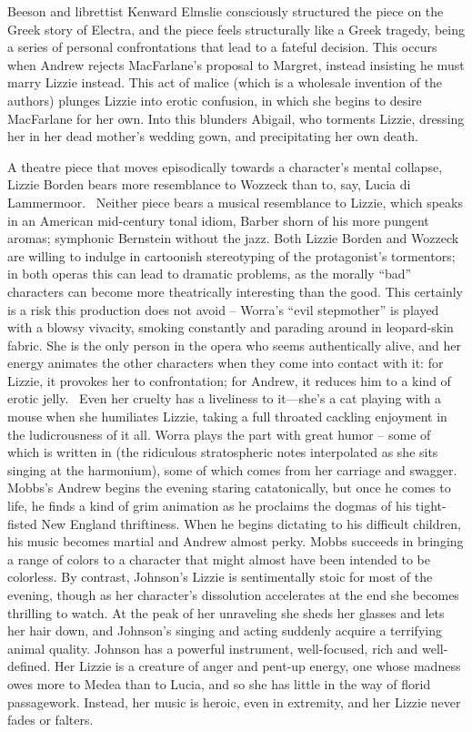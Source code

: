 Beeson and librettist Kenward Elmslie consciously structured the piece on the Greek story of Electra, and the piece feels structurally like a Greek tragedy, being a series of personal confrontations that lead to a fateful decision. This occurs when Andrew rejects MacFarlane’s proposal to Margret, instead insisting he must marry Lizzie instead. This act of malice (which is a wholesale invention of the authors) plunges Lizzie into erotic confusion, in which she begins to desire MacFarlane for her own. Into this blunders Abigail, who torments Lizzie, dressing her in her dead mother’s wedding gown, and precipitating her own death.

A theatre piece that moves episodically towards a character’s mental collapse, Lizzie Borden bears more resemblance to Wozzeck than to, say, Lucia di Lammermoor.  Neither piece bears a musical resemblance to Lizzie, which speaks in an American mid-century tonal idiom, Barber shorn of his more pungent aromas; symphonic Bernstein without the jazz. Both Lizzie Borden and Wozzeck are willing to indulge in cartoonish stereotyping of the protagonist’s tormentors; in both operas this can lead to dramatic problems, as the morally “bad” characters can become more theatrically interesting than the good. This certainly is a risk this production does not avoid – Worra’s “evil stepmother” is played with a blowsy vivacity, smoking constantly and parading around in leopard-skin fabric. She is the only person in the opera who seems authentically alive, and her energy animates the other characters when they come into contact with it: for Lizzie, it provokes her to confrontation; for Andrew, it reduces him to a kind of erotic jelly.  Even her cruelty has a liveliness to it—she’s a cat playing with a mouse when she humiliates Lizzie, taking a full throated cackling enjoyment in the ludicrousness of it all. Worra plays the part with great humor – some of which is written in (the ridiculous stratospheric notes interpolated as she sits singing at the harmonium), some of which comes from her carriage and swagger. Mobbs’s Andrew begins the evening staring catatonically, but once he comes to life, he finds a kind of grim animation as he proclaims the dogmas of his tight-fisted New England thriftiness. When he begins dictating to his difficult children, his music becomes martial and Andrew almost perky. Mobbs succeeds in bringing a range of colors to a character that might almost have been intended to be colorless. By contrast, Johnson’s Lizzie is sentimentally stoic for most of the evening, though as her character’s dissolution accelerates at the end she becomes thrilling to watch. At the peak of her unraveling she sheds her glasses and lets her hair down, and Johnson’s singing and acting suddenly acquire a terrifying animal quality. Johnson has a powerful instrument, well-focused, rich and well-defined. Her Lizzie is a creature of anger and pent-up energy, one whose madness owes more to Medea than to Lucia, and so she has little in the way of florid passagework. Instead, her music is heroic, even in extremity, and her Lizzie never fades or falters.


